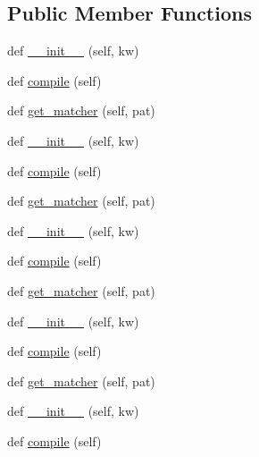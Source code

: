 \subsection*{Public Member Functions}
\begin{DoxyCompactItemize}
\item 
def \hyperlink{classwaflib_1_1_build_1_1_step_context_a3e290cd31f71f23a2b94fbab6f71b7d8}{\+\_\+\+\_\+init\+\_\+\+\_\+} (self, kw)
\item 
def \hyperlink{classwaflib_1_1_build_1_1_step_context_abf715b208d0aa13468949412b2461560}{compile} (self)
\item 
def \hyperlink{classwaflib_1_1_build_1_1_step_context_a28eeb1fce4fa89ccca2caedac1ee8464}{get\+\_\+matcher} (self, pat)
\item 
def \hyperlink{classwaflib_1_1_build_1_1_step_context_a3e290cd31f71f23a2b94fbab6f71b7d8}{\+\_\+\+\_\+init\+\_\+\+\_\+} (self, kw)
\item 
def \hyperlink{classwaflib_1_1_build_1_1_step_context_abf715b208d0aa13468949412b2461560}{compile} (self)
\item 
def \hyperlink{classwaflib_1_1_build_1_1_step_context_a28eeb1fce4fa89ccca2caedac1ee8464}{get\+\_\+matcher} (self, pat)
\item 
def \hyperlink{classwaflib_1_1_build_1_1_step_context_a3e290cd31f71f23a2b94fbab6f71b7d8}{\+\_\+\+\_\+init\+\_\+\+\_\+} (self, kw)
\item 
def \hyperlink{classwaflib_1_1_build_1_1_step_context_abf715b208d0aa13468949412b2461560}{compile} (self)
\item 
def \hyperlink{classwaflib_1_1_build_1_1_step_context_a28eeb1fce4fa89ccca2caedac1ee8464}{get\+\_\+matcher} (self, pat)
\item 
def \hyperlink{classwaflib_1_1_build_1_1_step_context_a3e290cd31f71f23a2b94fbab6f71b7d8}{\+\_\+\+\_\+init\+\_\+\+\_\+} (self, kw)
\item 
def \hyperlink{classwaflib_1_1_build_1_1_step_context_abf715b208d0aa13468949412b2461560}{compile} (self)
\item 
def \hyperlink{classwaflib_1_1_build_1_1_step_context_a28eeb1fce4fa89ccca2caedac1ee8464}{get\+\_\+matcher} (self, pat)
\item 
def \hyperlink{classwaflib_1_1_build_1_1_step_context_a3e290cd31f71f23a2b94fbab6f71b7d8}{\+\_\+\+\_\+init\+\_\+\+\_\+} (self, kw)
\item 
def \hyperlink{classwaflib_1_1_build_1_1_step_context_abf715b208d0aa13468949412b2461560}{compile} (self)
\item 

\end{DoxyCompactItemize}
